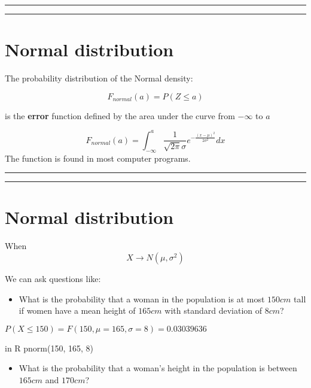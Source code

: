 \documentclass[
]{book}
\providecommand{\tightlist}{%
  \setlength{\itemsep}{0pt}\setlength{\parskip}{0pt}}
\begin{document}
\begin{center}\rule{0.5\linewidth}{0.5pt}\end{center}

\begin{center}\rule{0.5\linewidth}{0.5pt}\end{center}

\hypertarget{normal-distribution-1}{%
\section{Normal distribution}\label{normal-distribution-1}}

The probability distribution of the Normal density:

\[F_{normal}(a)=P(Z \leq a)\]

is the \textbf{error} function defined by the area under the curve from \(-\infty\) to \(a\)

\[F_{normal}(a)=\int_{-\infty}^{a}\frac{1}{\sqrt{2\pi}\sigma}e^{-\frac{(x-\mu)^2}{2\sigma^2}} dx\]
The function is found in most computer programs.

\begin{center}\rule{0.5\linewidth}{0.5pt}\end{center}

\begin{center}\rule{0.5\linewidth}{0.5pt}\end{center}

\hypertarget{normal-distribution-2}{%
\section{Normal distribution}\label{normal-distribution-2}}

When \[X \rightarrow N(\mu, \sigma^2)\]

We can ask questions like:

\begin{itemize}
\tightlist
\item
  What is the probability that a woman in the population is at most \(150cm\) tall if women have a mean height of \(165cm\) with standard deviation of \(8cm\)?
\end{itemize}

\(P(X\le 150)=F(150, \mu=165, \sigma=8)=0.03039636\)

in R pnorm(150, 165, 8)

\begin{itemize}
\tightlist
\item
  What is the probability that a woman's height in the population is between \(165cm\) and \(170cm\)?
\end{itemize}
\end{document}
